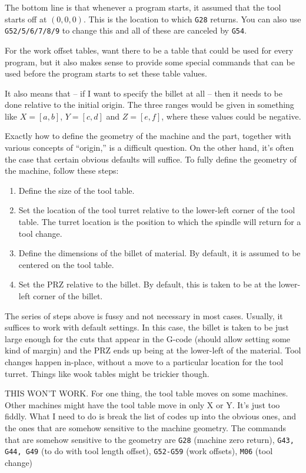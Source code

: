 \documentclass[titlepage,oneside,10pt]{article}
\begin{document}
The bottom line is that whenever a program starts, it assumed that the
tool starts off at $(0,0,0)$. This is the location to which {\tt G28}
returns. You can also use {\tt G52/5/6/7/8/9} to change this and all
of these are canceled by {\tt G54}.

For the work offset tables, want there to be a table that could be
used for every program, but it also makes sense to provide some
special commands that can be used before the program starts to set
these table values.

It also means that -- if I want to specify the billet at all -- then
it needs to be done relative to the initial origin. The three ranges
would be given in something like $X=[a,b]$, $Y=[c,d]$ and $Z=[e,f]$,
where these values could be negative.


Exactly how to define the geometry of the machine and the part,
together with various concepts of ``origin,'' is a difficult
question. On the other hand, it's often the case that certain obvious
defaults will suffice. To fully define the geometry of the machine,
follow these steps:
\begin{enumerate}
  \item Define the size of the tool table.
  \item Set the location of the tool turret relative to the lower-left
    corner of the tool table. The turret location is the position to
    which the spindle will return for a tool change.
  \item Define the dimensions of the billet of material. By default,
    it is assumed to be centered on the tool table.
  \item Set the PRZ relative to the billet. By default, this is taken
    to be at the lower-left corner of the billet.
\end{enumerate}  
The series of steps above is fussy and not necessary in most
cases. Usually, it suffices to work with default settings. In this
case, the billet is taken to be just large enough for the cuts that
appear in the G-code (should allow setting some kind of margin) and
the PRZ ends up being at the lower-left of the material. Tool changes
happen in-place, without a move to a particular location for the tool
turret. Things like wook tables might be trickier though.

THIS WON'T WORK. For one thing, the tool table moves on some
machines. Other machines might have the tool table move in only X or
Y. It's just too fiddly. What I need to do is break the list of codes
up into the obvious ones, and the ones that are somehow sensitive to
the machine geometry. The commands that are somehow sensitive to the
geometry are {\tt G28} (machine zero return), {\tt G43, G44, G49} (to
do with tool length offset), {\tt G52-G59} (work offsets), {\tt M06}
(tool change)
\end{document}
